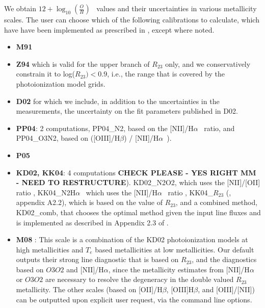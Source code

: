 \documentclass{emulateapj}
\newcommand{\oxab}{\ensuremath{12 + \log_{10}(\frac{O}{H})}}
\newcommand{\ha}{H$\alpha$}
\newcommand{\hb}{H$\beta$}
\begin{document}
We obtain \oxab~ values and their uncertainties in various metallicity scales.
 The user can choose which of the following calibrations to calculate, which have  have been implemented as prescribed in \citet{kewley08}, except where noted. 
\begin{itemize}
\item {\bf M91} \citep{mcgaugh91}
\item {\bf Z94} \citep{zaritsky94} which is valid for the upper branch of $R_{23}$ only, and we conservatively constrain it to log($R_{23})<0.9$, i.e., the range that is covered by the photoionization model grids.
\item {\bf D02} \citep{denicolo02} for which we include, in addition to the uncertainties in the measurements, the uncertainty on the fit parameters published in D02.
\item {\bf PP04}:  \citep{pettini04} 2 computations,  PP04\_N2, based on the [NII]/\ha~ ratio, and PP04\_O3N2, based on  ([OIII]/\hb) / [NII]/\ha~).  
\item {\bf P05} \citep{pilyugin05}
\item {\bf KD02, KK04}: 4 computations \textbf{CHECK PLEASE - YES RIGHT MM - NEED TO RESTRUCTURE}). KD02\_N2O2, which uses the [NII]/[OII] ratio \citep{kewley02}, KK04\_N2\ha~  which uses the [NII]/\ha~ ratio \citep{kobulnicky04}, KK04\_$R_{23}$ (\citealt{kewley08}, appendix A2.2), which is based on the value of $R_{23}$, and a combined method, KD02\_comb, that chooses the optimal method given the input line fluxes and is implemented as described in Appendix 2.3 of \citet{kewley08}. 
\item {\bf M08} \citep{maiolino08}: This scale is a combination of the KD02 photoionization models at high metallicities and $T_e$ based metallicities at low metallicities. Our default outputs their strong line diagnostic that is based on $R_{23}$, and the diagnostics based on $O3O2$ and [NII]/\ha, since the metallicity estimates from  [NII]/\ha~ or $O3O2$ are necessary to resolve the degeneracy in the double valued $R_{23}$ metallicity. The other scales (based on [OII]/\hb, [OIII]\hb, and [OIII]/[NII]) can be outputted upon explicit user request, via the command line options. 

\end{itemize}
\end{document}
